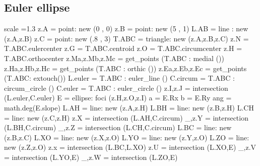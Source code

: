 \subsection{Euler ellipse} %
\label{sub:hexagram}
\begin{tkzelements}
  scale =1.3
z.A      = point: new (0 , 0)
z.B      = point: new (5 , 1)
L.AB     = line : new (z.A,z.B)
z.C      = point: new (.8 , 3)
T.ABC    = triangle: new (z.A,z.B,z.C)
z.N       = T.ABC.eulercenter
z.G       = T.ABC.centroid
z.O       = T.ABC.circumcenter
z.H       = T.ABC.orthocenter
z.Ma,z.Mb,z.Mc = get_points (T.ABC : medial ())
z.Ha,z.Hb,z.Hc = get_points (T.ABC : orthic ())   
z.Ea,z.Eb,z.Ec   = get_points (T.ABC: extouch())
L.euler      = T.ABC : euler_line () 
C.circum     = T.ABC : circum_circle () 
C.euler      = T.ABC : euler_circle () 
z.I,z.J      = intersection (L.euler,C.euler) 
E = ellipse: foci (z.H,z.O,z.I)  
a = E.Rx
b = E.Ry
ang     = math.deg(E.slope)
L.AH    = line: new (z.A,z.H)
L.BH    = line: new (z.B,z.H)
L.CH    = line: new (z.C,z.H)
z.X     = intersection (L.AH,C.circum)  
_,z.Y   = intersection (L.BH,C.circum)  
_,z.Z   = intersection (L.CH,C.circum)  
L.BC    = line: new (z.B,z.C) 
L.XO    = line: new (z.X,z.O)
L.YO    = line: new (z.Y,z.O)
L.ZO    = line: new (z.Z,z.O)
z.x     = intersection (L.BC,L.XO)
z.U     = intersection (L.XO,E)
_,z.V   = intersection (L.YO,E)
_,z.W   = intersection (L.ZO,E) 
\end{tkzelements}

